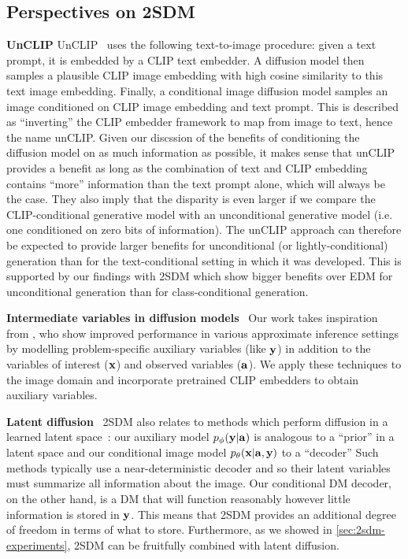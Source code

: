 \subsection{Perspectives on 2SDM}
\textbf{UnCLIP} \label{sec:unclip}
UnCLIP~\citep{ramesh2022hierarchical} uses the following text-to-image procedure: given a text prompt, it is embedded by a CLIP text embedder. A diffusion model then samples a plausible CLIP image embedding with high cosine similarity to this text image embedding. Finally, a conditional image diffusion model samples an image conditioned on CLIP image embedding and text prompt. This is described as ``inverting'' the CLIP embedder framework to map from image to text, hence the name unCLIP. Given our discssion of the benefits of conditioning the diffusion model on as much information as possible, it makes sense that unCLIP provides a benefit as long as the combination of text and CLIP embedding contains ``more'' information than the text prompt alone, which will always be the case. They also imply that the disparity is even larger if we compare the CLIP-conditional generative model with an unconditional generative model  (i.e. one conditioned on zero bits of information). The unCLIP approach can therefore be expected to provide larger benefits for unconditional (or lightly-conditional) generation than for the text-conditional setting in which it was developed. This is supported by our findings with 2SDM which show bigger benefits over EDM for unconditional generation than for class-conditional generation.

\textbf{Intermediate variables in diffusion models}~
 Our work takes inspiration from \citet{weilbach2023graphically}, %
who show improved performance in various approximate inference settings by modelling problem-specific auxiliary variables (like ${\mathbf{y}}$) in addition to the variables of interest (${\mathbf{x}}$) and observed variables (${\mathbf{a}}$). We apply these techniques to the image domain and incorporate pretrained CLIP embedders to obtain auxiliary variables. 

\textbf{Latent diffusion}~
2SDM also relates to methods which perform diffusion in a learned latent space~\citep{rombach2022high}: our auxiliary model $p_\phi({\mathbf{y}}|{\mathbf{a}})$ is analogous to a ``prior'' in a latent space and our conditional image model $p_\theta({\mathbf{x}}|{\mathbf{a}},{\mathbf{y}})$ to a ``decoder'' Such methods typically use a near-deterministic decoder and so their latent variables must summarize all information about the image. Our conditional DM decoder, on the other hand, is a DM that will function reasonably however little information is stored in ${\mathbf{y}}$. This means that 2SDM provides an additional degree of freedom in terms of what to store. Furthermore, as we showed in \cref{sec:2sdm-experiments}, 2SDM can be fruitfully combined with latent diffusion.

